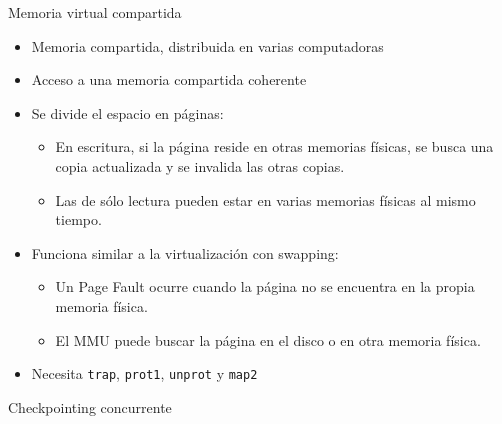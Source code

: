 \documentclass[xcolor=pdftex,dvipsnames,usenames,table]{beamer}
\begin{document}
\begin{frame}{Memoria virtual compartida}
  \begin{itemize}
    \item Memoria compartida, distribuida en varias computadoras
    \item Acceso a una memoria compartida coherente
    \item Se divide el espacio en páginas:
    \begin{itemize}
      \item En escritura, si la página reside en otras memorias físicas, se
            busca una copia actualizada y se invalida las otras copias.
      \item Las de sólo lectura pueden estar en varias memorias físicas al mismo
            tiempo.
    \end{itemize}
    \item Funciona similar a la virtualización con swapping:
    \begin{itemize}
      \item Un Page Fault ocurre cuando la página no se encuentra en la propia
            memoria física.
      \item El MMU puede buscar la página en el disco o en otra memoria física.
    \end{itemize}
    \item Necesita \texttt{trap}, \texttt{prot1}, \texttt{unprot} y \texttt{map2}
  \end{itemize}
\end{frame}

\begin{frame}{Checkpointing concurrente}
\end{frame}
\end{document}
